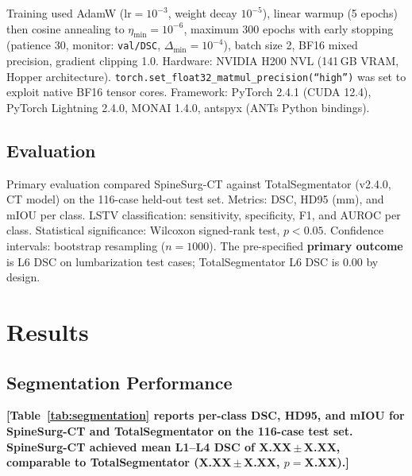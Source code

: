 \documentclass{article}
\newcommand{\ph}[1]{\textcolor{placeholder}{\textbf{[#1]}}}
\begin{document}
Training used AdamW ($\text{lr}{=}10^{-3}$, weight decay $10^{-5}$), linear
warmup (5 epochs) then cosine annealing to $\eta_{\min}{=}10^{-6}$, maximum
300 epochs with early stopping (patience 30, monitor: \texttt{val/DSC},
$\Delta_{\min}{=}10^{-4}$), batch size 2, BF16 mixed precision, gradient
clipping 1.0. Hardware: NVIDIA H200 NVL (141\,GB VRAM, Hopper architecture).
\texttt{torch.set\_float32\_matmul\_precision(``high'')} was set to exploit
native BF16 tensor cores. Framework: PyTorch 2.4.1 (CUDA 12.4), PyTorch
Lightning 2.4.0, MONAI 1.4.0, antspyx (ANTs Python bindings).

\subsection{Evaluation}

Primary evaluation compared SpineSurg-CT against TotalSegmentator (v2.4.0,
CT model) on the 116-case held-out test set. Metrics: DSC, HD95 (mm), and
mIOU per class. LSTV classification: sensitivity, specificity, F1, and AUROC
per class. Statistical significance: Wilcoxon signed-rank test, $p{<}0.05$.
Confidence intervals: bootstrap resampling ($n{=}1000$). The pre-specified
\textbf{primary outcome} is L6 DSC on lumbarization test cases;
TotalSegmentator L6 DSC is 0.00 by design.

\section{Results}

\subsection{Segmentation Performance}

\ph{Table~\ref{tab:segmentation} reports per-class DSC, HD95, and mIOU for
SpineSurg-CT and TotalSegmentator on the 116-case test set. SpineSurg-CT
achieved mean L1--L4 DSC of X.XX\,$\pm$\,X.XX, comparable to TotalSegmentator
(X.XX\,$\pm$\,X.XX, $p{=}$X.XX).}
\end{document}

